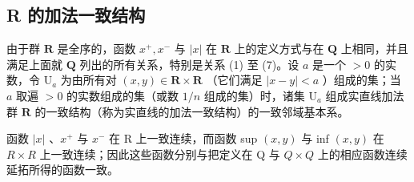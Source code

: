 \subsection{R 的加法一致结构}

由于群 \(\mathbf{R}\) 是全序的，函数 \(x^{+}, x^{-}\) 与 \(|x|\) 在 \(\mathbf{R}\) 上的定义方式与在 \(\mathbf{Q}\) 上相同，并且满足上面就 \(\mathbf{Q}\) 列出的所有关系，特别是关系 (1) 至 (7)。设 \(a\) 是一个 \(>0\) 的实数，令 \(\mathrm{U}_{a}\) 为由所有对 \((x, y) \in \mathbf{R} \times \mathbf{R}\) （它们满足 \(|x - y| < a\) ）组成的集；当 \(a\) 取遍 \(>0\) 的实数组成的集（或数 \(1/n\) 组成的集）时，诸集 \(\mathrm{U}_{a}\) 组成实直线加法群 \(\mathbf{R}\) 的一致结构（称为实直线的加法一致结构）的一致邻域基本系。

函数 \(|x|\) 、\(x^{+}\) 与 \(x^{-}\) 在 R 上一致连续，而函数 sup \((x, y)\) 与 inf \((x, y)\) 在 \(R \times R\) 上一致连续；因此这些函数分别与把定义在 Q 与 \(Q \times Q\) 上的相应函数连续延拓所得的函数一致。

